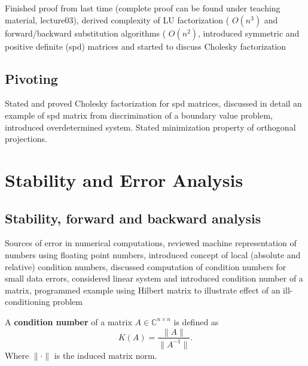 \documentclass{article}
\theoremstyle{remark}
\begin{document}
\begin{tcolorbox}
  Finished proof from last time (complete proof can be found under teaching material, lecture03), derived complexity of LU factorization ( $O(n^3)$  and forward/backward substitution algorithms ( $O(n^2)$, introduced symmetric and positive definite (spd) matrices and started to discuss Cholesky factorization	
\end{tcolorbox}

\subsection{Pivoting}%
\label{sub:pivoting}
\begin{tcolorbox}
  Stated and proved Cholesky factorization for spd matrices, discussed in detail an example of spd matrix from discrimination of a boundary value problem, introduced overdetermined system. Stated minimization property of orthogonal projections.
\end{tcolorbox}

\newpage
\section{Stability and Error Analysis}%
\label{sec:stability_and_error_analysis}

 


\subsection{Stability, forward and backward analysis}%
\label{sub:stability_forward_and_backward_analysis}

\begin{tcolorbox}
  Sources of error in numerical computations, reviewed machine representation of numbers using floating point numbers, introduced concept of local (absolute and relative) condition numbers, discussed computation of condition numbers for small data errors, considered linear system and introduced condition number of a matrix, programmed example using Hilbert matrix to illustrate effect of an ill-conditioning problem	
\end{tcolorbox}

\begin{definition}
  A \textbf{condition number} of a matrix $A \in \mathbb{C}^{n\times n }$ is defined as 
\begin{equation}
\label{eq:condition_number}
K\left( A \right) =  \frac{\|A\|}{\|A^{-1}\|}
.\end{equation}
Where $\|\cdot\|$ is the induced matrix norm. 
\end{definition}
\end{document}
